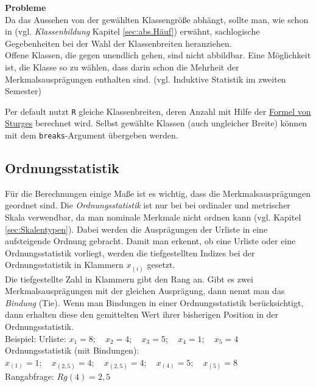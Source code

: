 \documentclass[a4paper]{article}
\newcommand\dangersign[1][2ex]{%
  \renewcommand\stacktype{L}%
  \scaleto{\stackon[1.3pt]{\color{red}$\triangle$}{\tiny !}}{#1}%
}
\begin{document}
\noindent \textbf{Probleme}\\
Da das Aussehen von der gewählten Klassengröße abhängt, sollte man, wie schon in (vgl. \textit{Klassenbildung} Kapitel \ref{sec:abs.Häuf})  erwähnt, sachlogische Gegebenheiten bei der Wahl der Klassenbreiten heranziehen.\\
Offene Klassen, die gegen unendlich gehen, sind nicht abbildbar. Eine Möglichkeit ist, die Klasse so zu wählen, dass darin schon die Mehrheit der Merkmalsausprägungen enthalten sind. (vgl. Induktive Statistik im zweiten Semester)\\

\noindent {}

\noindent \dangersign[3ex] Per default nutzt \texttt{R} gleiche Klassenbreiten, deren Anzahl mit Hilfe der \href{https://en.wikipedia.org/wiki/Histogram#Sturges'_formula}{Formel von Sturges} berechnet wird. Selbst gewählte Klassen (auch ungleicher Breite) können mit dem \texttt{breaks}-Argument übergeben werden.

\subsection{Ordnungsstatistik}

Für die Berechnungen einige Maße ist es wichtig, dass die Merkmalsausprägungen geordnet sind. Die \textit{Ordnungsstatistik} ist nur bei bei ordinaler und metrischer Skala verwendbar, da man nominale Merkmale nicht ordnen kann (vgl. Kapitel \ref{sec:Skalentypen}). Dabei werden die Ausprägungen der Urliste in eine aufsteigende Ordnung gebracht. Damit man erkennt, ob eine Urliste oder eine Ordnungsstatistik vorliegt, werden die tiefgestellten Indizes bei der Ordnungsstatistik in Klammern $x_{(i)}$ gesetzt.\\
Die tiefgestellte Zahl in Klammern gibt den Rang an. Gibt es zwei Merkmalsausprägungen mit der gleichen Ausprägung, dann nennt man das \textit{Bindung} (Tie). Wenn man Bindungen in einer Ordnungsstatistik berücksichtigt, dann erhalten diese den gemittelten Wert ihrer bisherigen Position in der Ordnungsstatistik.\\
Beispiel: Urliste: $x_1=8;\quad x_2=4;\quad x_3=5;\quad x_4=1;\quad x_5=4$\\
Ordnungsstatistik (mit Bindungen): $x_{(1)}=1;\quad x_{(2,5)}=4;\quad x_{(2,5)}=4;\quad x_{(4)}=5;\quad x_{(5)}=8$\\
Rangabfrage: $Rg(4)=2,5$\\
\end{document}
